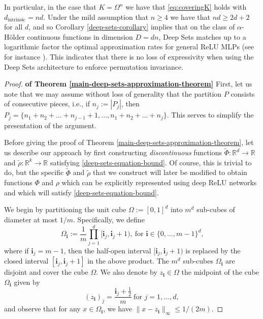\documentclass[twoside,11pt]{article}
\newcommand{\dint}{d_{\text{intrinsic}}}
\begin{document}
In particular, in the case that $K=\Omega^n $ we have that \eqref{eq:coveringK} holds with $\dint=nd $. Under the mild assumption that $n\geq 4$ we have that $nd\geq 2d+2 $ for all $d$, and so 
Corollary \ref{deep-sets-corollary} implies that on the class of $\alpha$-H\"older continuous functions in dimension $D = dn$, Deep Sets matches up to a logarithmic factor the optimal approximation rates for general ReLU MLPs (see for instance \cite{siegel2023optimal,yarotsky2018optimal,shen2022optimal}). This indicates that there is no loss of expressivity when using the Deep Sets architecture to enforce permutation invariance.
\newline
\begin{proof}\textbf{of Theorem \ref{main-deep-sets-approximation-theorem}}
First, let us note that we may assume without loss of generality that the partition $P$ consists of consecutive pieces, i.e., if $n_j := |P_j|$, then $P_j = \{n_1 + n_2 + ... + n_{j-1} + 1,...,n_1 + n_2 + ... + n_{j}\}$. This serves to simplify the presentation of the argument.

Before giving the proof of Theorem \ref{main-deep-sets-approximation-theorem}, let us describe our approach by first constructing \textit{discontinuous} functions $\widetilde{\Phi}:\mathbb{R}^d\rightarrow \mathbb{R}$ and $\widetilde{\rho}:\mathbb{R}^k\rightarrow \mathbb{R}$ satisfying \eqref{deep-sets-equation-bound}. Of course, this is trivial to do, but the specific $\widetilde{\Phi}$ and $\widetilde{\rho}$ that we construct will later be modified to obtain functions $\Phi$ and $\rho$ which can be explicitly represented using deep ReLU networks and which will satisfy \eqref{deep-sets-equation-bound}.

We begin by partitioning the unit cube $\Omega := [0,1]^d$ into $m^d$ sub-cubes of diameter at most $1/m$. Specifically, we define
\begin{equation}
    \Omega_{\textbf{i}} := \frac{1}{m}\prod_{j=1}^d [\textbf{i}_j, \textbf{i}_j+1),~\text{for $\textbf{i}\in \{0,...,m-1\}^d$,}
\end{equation}
where if $\textbf{i}_j = m-1$, then the half-open interval $[\textbf{i}_j, \textbf{i}_j+1)$ is replaced by the closed interval $[\textbf{i}_j, \textbf{i}_j+1]$ in the above product. The $m^d$ sub-cubes $\Omega_\textbf{i}$ are disjoint and cover the cube $\Omega$. We also denote by $z_\textbf{i}\in \Omega$ the midpoint of the cube $\Omega_\textbf{i}$ given by
\begin{equation}
    (z_\textbf{i})_j = \frac{\textbf{i}_j + \frac{1}{2}}{m}~\text{for $j=1,...,d$},
\end{equation}
and observe that for any $x\in \Omega_\textbf{i}$, we have $\|x - z_\textbf{i}\|_{\infty} \leq 1/(2m)$.


\end{proof}
\end{document}
